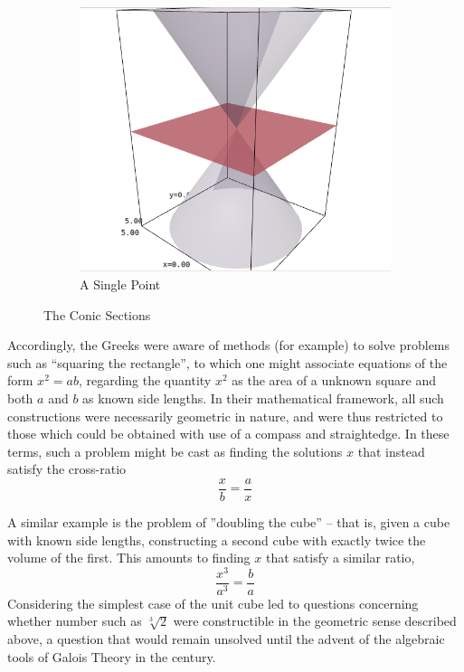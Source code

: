 \documentclass{article}
\theoremstyle{definition}
\begin{document}
\begin{figure}[H]
~ %
\begin{subfigure}[b]{0.3\textwidth}
\includegraphics[width=\textwidth]{Selection_054}
\caption{A Single Point}
\label{fig:mouse}
\end{subfigure}
\caption{The Conic Sections}\label{fig:animals}
\end{figure}

Accordingly, the Greeks were aware of methods (for example) to solve
problems such as ``squaring the rectangle'', to which one might associate
equations of the form \(x^2 = ab\), regarding the quantity \(x^2\) as
the area of a unknown square and both \(a\) and \(b\) as known side
lengths. In their mathematical framework, all such constructions were
necessarily geometric in nature, and were thus restricted to those which
could be obtained with use of a compass and straightedge. In these
terms, such a problem might be cast as finding the solutions \(x\) that instead satisfy the cross-ratio \[\frac{x}{b} = \frac{a}{x}\]

A similar example is the problem of ''doubling the cube'' -- that is, given a cube
with known side lengths, constructing a second cube with exactly twice
the volume of the first. This amounts to finding \(x\) that satisfy a
similar ratio, \[\frac{x^3}{a^3} = \frac{b}{a}\] Considering the
simplest case of the unit cube led to questions concerning whether
number such as \(\sqrt[3]{2}\) were constructible in the geometric sense
described above, a question that would remain unsolved until the advent
of the algebraic tools of Galois Theory in the  century.
\end{document}

